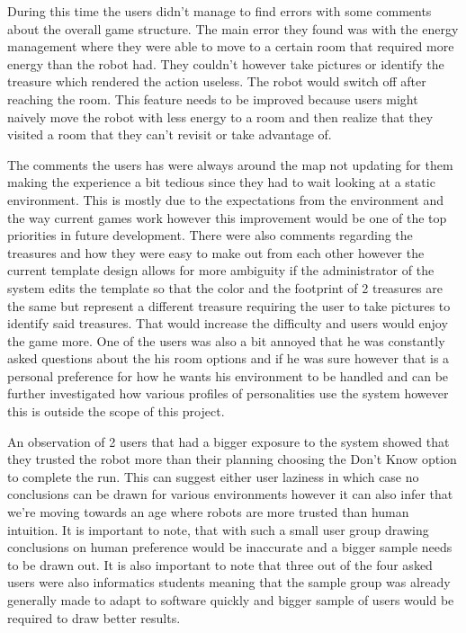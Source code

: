       During this time the users didn't manage to find errors with some comments about the overall game structure. The main error they found was with the energy management where they were able to move to a certain room that required more energy than the robot had. They couldn't however take pictures or identify the treasure which rendered the action useless. The robot would switch off after reaching the room. This feature needs to be improved because users might naively move the robot with less energy to a room and then realize that they visited a room that they can't revisit or take advantage of.

      The comments the users has were always around the map not updating for them making the experience a bit tedious since they had to wait looking at a static environment. This is mostly due to the expectations from the environment and the way current games work however this improvement would be one of the top priorities in future development. There were also comments regarding the treasures and how they were easy to make out from each other however the current template design allows for more ambiguity if the administrator of the system edits the template so that the color and the footprint of 2 treasures are the same but represent a different treasure requiring the user to take pictures to identify said treasures. That would increase the difficulty and users would enjoy the game more. One of the users was also a bit annoyed that he was constantly asked questions about the his room options and if he was sure however that is a personal preference for how he wants his environment to be handled and can be further investigated how various profiles of personalities use the system however this is outside the scope of this project.

      An observation of 2 users that had a bigger exposure to the system showed that they trusted the robot more than their planning choosing the Don't Know option to complete the run. This can suggest either user laziness in which case no conclusions can be drawn for various environments however it can also infer that we're moving towards an age where robots are more trusted than human intuition. It is important to note, that with such a small user group drawing conclusions on human preference would be inaccurate and a bigger sample needs to be drawn out. It is also important to note that three out of the four asked users were also informatics students meaning that the sample group was already generally made to adapt to software quickly and bigger sample of users would be required to draw better results.

